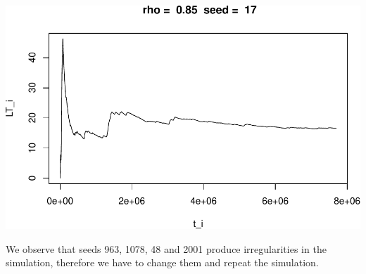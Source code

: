 \documentclass[]{article}
\begin{document}
\includegraphics{003_files/figure-latex/unnamed-chunk-19-10.pdf}

We observe that seeds 963, 1078, 48 and 2001 produce irregularities in
the simulation, therefore we have to change them and repeat the
simulation.
\end{document}

